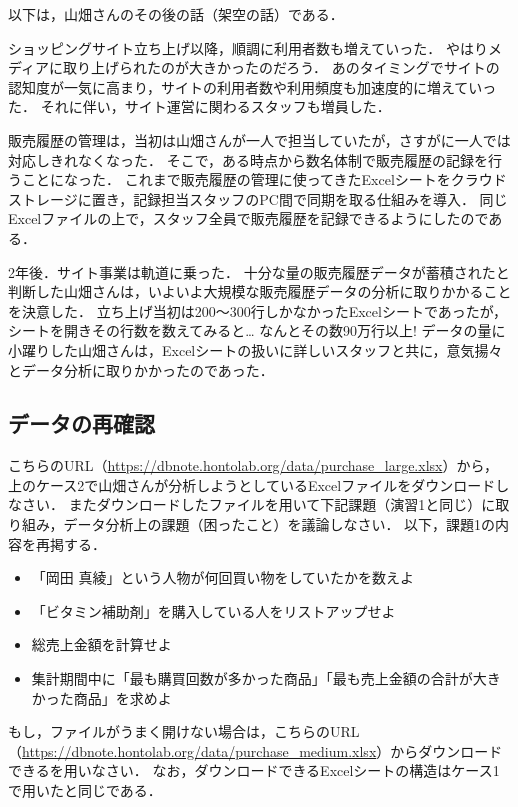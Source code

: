 以下は，山畑さんのその後の話（架空の話）である．

\begin{framed}
ショッピングサイト立ち上げ以降，順調に利用者数も増えていった．
やはりメディアに取り上げられたのが大きかったのだろう．
あのタイミングでサイトの認知度が一気に高まり，サイトの利用者数や利用頻度も加速度的に増えていった．
それに伴い，サイト運営に関わるスタッフも増員した．

販売履歴の管理は，当初は山畑さんが一人で担当していたが，さすがに一人では対応しきれなくなった．
そこで，ある時点から数名体制で販売履歴の記録を行うことになった．
これまで販売履歴の管理に使ってきたExcelシートをクラウドストレージに置き，記録担当スタッフのPC間で同期を取る仕組みを導入．
同じExcelファイルの上で，スタッフ全員で販売履歴を記録できるようにしたのである．

2年後．サイト事業は軌道に乗った．
十分な量の販売履歴データが蓄積されたと判断した山畑さんは，いよいよ大規模な販売履歴データの分析に取りかかることを決意した．
立ち上げ当初は200〜300行しかなかったExcelシートであったが，シートを開きその行数を数えてみると…
なんとその数90万行以上!
データの量に小躍りした山畑さんは，Excelシートの扱いに詳しいスタッフと共に，意気揚々とデータ分析に取りかかったのであった．
\end{framed}


\subsection*{データの再確認}
こちらのURL（\url{https://dbnote.hontolab.org/data/purchase\_large.xlsx}）から，上のケース2で山畑さんが分析しようとしているExcelファイルをダウンロードしなさい．
またダウンロードしたファイルを用いて下記課題（演習1と同じ）に取り組み，データ分析上の課題（困ったこと）を議論しなさい．
以下，課題1の内容を再掲する．
\begin{itemize}
    \item 「岡田 真綾」という人物が何回買い物をしていたかを数えよ
    \item 「ビタミン補助剤」を購入している人をリストアップせよ
    \item 総売上金額を計算せよ
    \item 集計期間中に「最も購買回数が多かった商品」「最も売上金額の合計が大きかった商品」を求めよ
    \end{itemize}
もし，ファイルがうまく開けない場合は，こちらのURL（\url{https://dbnote.hontolab.org/data/purchase\_medium.xlsx}）からダウンロードできるを用いなさい．
なお，ダウンロードできるExcelシートの構造はケース1で用いたと同じである．


